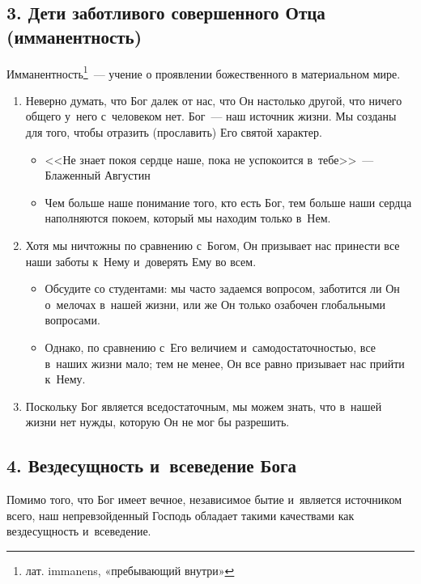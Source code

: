 \documentclass[a4paper,12pt]{article}
\begin{document}
\subsection{3. Дети заботливого совершенного Отца (имманентность)}

Имманентность\footnote{лат. immanens, «пребывающий внутри»}~--- учение о проявлении божественного в материальном мире.

\begin{enumerate}
    \item Неверно думать, что Бог далек от нас, что Он настолько другой, что ничего общего у~него с~человеком нет. Бог~--- наш источник жизни. Мы созданы для того, чтобы отразить (прославить) Его святой характер.
    \begin{itemize}
        \item <<Не знает покоя сердце наше, пока не успокоится в~тебе>>~--- Блаженный Августин 
        \item Чем больше наше понимание того, кто есть Бог, тем больше наши сердца наполняются покоем, который мы находим только в~Нем.
    \end{itemize}
    \item Хотя мы ничтожны по сравнению с~Богом, Он призывает нас принести все наши заботы к~Нему и~доверять Ему во всем.
    \begin{itemize}
        \item Обсудите со студентами: мы часто задаемся вопросом, заботится ли Он о~мелочах в~нашей жизни, или же Он только озабочен глобальными вопросами.
        \item Однако, по сравнению с~Его величием и~самодостаточностью, все в~наших жизни мало; тем не менее, Он все равно призывает нас прийти к~Нему.
    \end{itemize}
    \item Поскольку Бог является вседостаточным, мы можем знать, что в~нашей жизни нет нужды, которую Он не мог бы разрешить.
\end{enumerate}

\subsection{4. Вездесущность и~всеведение Бога}

Помимо того, что Бог имеет вечное, независимое бытие и~является источником всего, наш непревзойденный Господь обладает такими качествами как вездесущность и~всеведение. 
\end{document}
